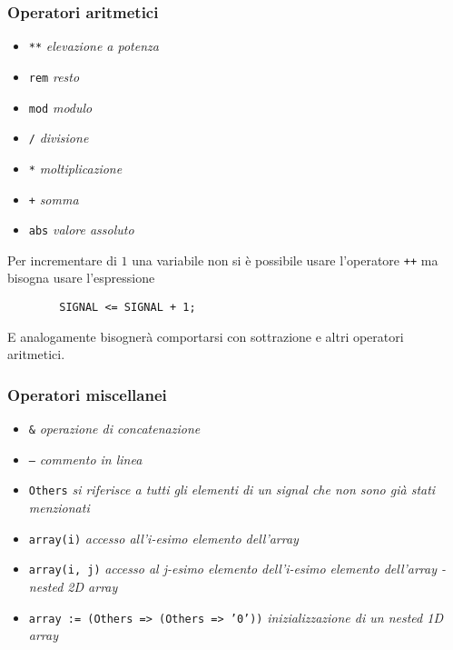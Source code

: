 \documentclass{article}
\begin{document}
\subsubsection{Operatori aritmetici}
\begin{itemize}
  \item \texttt{**} \textit{elevazione a potenza}
  \item \texttt{rem} \textit{resto}
  \item \texttt{mod} \textit{modulo}
  \item \texttt{/} \textit{divisione}
  \item \texttt{*} \textit{moltiplicazione}
  \item \texttt{+} \textit{somma}
  \item \texttt{abs} \textit{valore assoluto}

\end{itemize}
Per incrementare di \(1\) una variabile non si è possibile usare l'operatore \texttt{++} ma bisogna usare l'espressione
\begin{verbatim}
	    SIGNAL <= SIGNAL + 1;
\end{verbatim}
E analogamente bisognerà comportarsi con sottrazione e altri operatori aritmetici.
\subsubsection{Operatori miscellanei} \label{miscellanei}
\begin{itemize}
  \item \texttt{\&} \textit{operazione di concatenazione}
  \item \texttt{--} \textit{commento in linea}
  \item \texttt{Others} \textit{si riferisce a tutti gli elementi di un signal che non sono già stati menzionati}
  \item \texttt{array(i)} \textit{accesso all'i-esimo elemento dell'array}
  \item \texttt{array(i, j)} \textit{accesso al j-esimo elemento dell'i-esimo elemento dell'array - nested 2D array}
  \item \texttt{array := (Others  =>  (Others  =>  '0'))} \textit{inizializzazione di un nested 1D array}
\end{itemize}

\newpage
\end{document}
